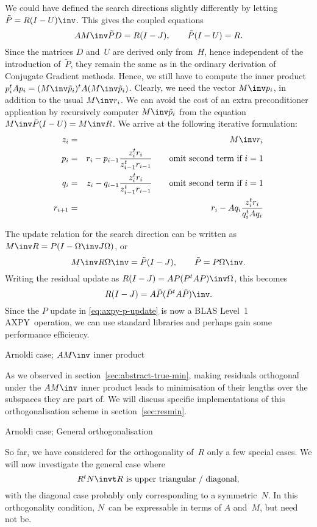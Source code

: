 \documentclass[11pt]{artikel3}
\begin{document}
\begin{Outline}
We could have defined the search directions
slightly differently by letting $\tilde P=R(I-U)\inv$.
This gives the coupled equations
\[ AM\inv \tilde PD=R(I-J), \qquad \tilde P(I-U)=R. \]
Since the matrices $D$ and~$U$ are derived only from~$H$, hence independent
of the introduction of~$\tilde P$, they remain the same as in the ordinary
derivation of Conjugate Gradient methods.
Hence, we still have to compute the inner product
$p_i^tAp_i=(M\inv\tilde p_i)^tA(M\inv\tilde p_i)$.
Clearly, we need the vector $M\inv p_i$, in addition to the usual $M\inv r_i$.
We can avoid the cost of an extra preconditioner application by
recursively computer $M\inv \tilde p_i$ from the equation
$M\inv\tilde P(I-U)=\nobreak M\inv R$. We arrive at the following 
iterative formulation:
\begin{eqnarray*}
    z_i&=&M\inv r_i\\
    p_i&=&r_i-p_{i-1}{z_i^tr_i\over z_{i-1}^tr_{i-1}}
                \qquad\hbox{omit second term if $i=1$}\\
    q_i&=&z_i-q_{i-1}{z_i^tr_i\over z_{i-1}^tr_{i-1}}
                \qquad\hbox{omit second term if $i=1$}\\
    r_{i+1}&=&r_i-Aq_i{z_i^tr_i\over q_i^tAq_i}
\end{eqnarray*}

The update relation for the search direction can be written as $M\inv
R=P(I-\Omega\inv J\Omega)$, or
\begin{equation}
    M\inv R\Omega\inv=\tilde P(I-J),\qquad \tilde P=P\Omega\inv.
    \label{eq:axpy-p-update}\end{equation}
Writing the residual update as $R(I-J)=AP(P^tAP)\inv\Omega$, this
becomes
\[ R(I-J) = A\tilde P(\tilde P^tA\tilde P)\inv. \]
%
Since the $P$ update in \eqref{eq:axpy-p-update} is now a BLAS Level~1
AXPY~operation, we can use standard libraries and perhaps gain some
performance efficiency.

 {Arnoldi case; $AM\inv$ inner product}

As we observed in section~\ref{sec:abstract-true-min}, making
residuals orthogonal under the $AM\inv$ inner product leads to
minimisation of their lengths over the subspaces they are part of. We
will discuss specific implementations of this orthogonalisation scheme
in section~\ref{sec:resmin}.

 {Arnoldi case; General orthogonalisation}
\label{sec:cg:inprod}

So far, we have considered for the orthogonality of~$R$ only 
a few special cases. 
We will now investigate the general case where
\[ \hbox{$R^tN\invt R$ is upper triangular / diagonal}, \]
with the diagonal case probably only corresponding to a symmetric~$N$.
In this orthogonality condition, $N$~can be expressable in terms
of $A$ and~$M$, but need not be.


\end{Outline}
\end{document}
